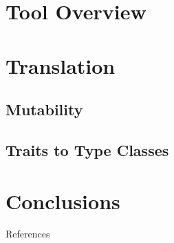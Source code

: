 \section{Tool Overview}

\section{Translation}

\subsection{Mutability}

\subsection{Traits to Type Classes}

\section{Conclusions}



\begin{frame}[allowframebreaks]{References}
  
  
\end{frame}
